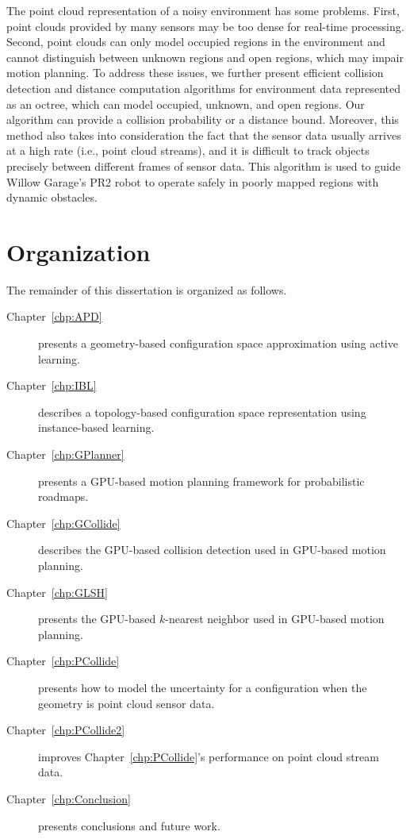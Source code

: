 The point cloud representation of a noisy environment has some problems. First, point clouds provided by many
sensors may be too dense for real-time processing. Second, point clouds can only model occupied
regions in the environment and cannot distinguish between unknown regions and open regions, which may impair motion planning. To address these issues, we further present efficient collision detection and
distance computation algorithms for environment data represented as an octree, which can model occupied,
unknown, and open regions. Our algorithm can provide a collision probability or a distance bound. Moreover,
this method also takes into consideration the fact that the sensor data usually arrives at a high rate (i.e., point cloud streams), and it is
difficult to track objects precisely between different frames of sensor data. This algorithm is used to guide Willow Garage's PR2 robot to operate safely in
poorly mapped regions with dynamic obstacles.

\section{Organization}
The remainder of this dissertation is organized as follows.

 \begin{description}
 \item[Chapter~\ref{chp:APD}] presents a geometry-based configuration space approximation using active learning.
 \item[Chapter~\ref{chp:IBL}] describes a topology-based configuration space representation using instance-based learning.
 \item[Chapter~\ref{chp:GPlanner}] presents a GPU-based motion planning framework for probabilistic roadmaps.
 \item[Chapter~\ref{chp:GCollide}] describes the GPU-based collision detection used in GPU-based motion planning.
 \item[Chapter~\ref{chp:GLSH}] presents the GPU-based $k$-nearest neighbor used in GPU-based motion planning.
 \item[Chapter~\ref{chp:PCollide}] presents how to model the uncertainty for a configuration when the geometry is point cloud sensor data.
 \item[Chapter~\ref{chp:PCollide2}] improves Chapter~\ref{chp:PCollide}'s performance on point cloud stream data.
 \item[Chapter~\ref{chp:Conclusion}] presents conclusions and future work.
 \end{description}


